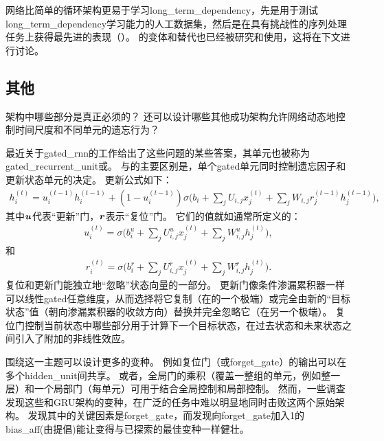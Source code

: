 
网络比简单的循环架构更易于学习\gls{long_term_dependency}，先是用于测试\gls{long_term_dependency}学习能力的人工数据集\citep{Bengio-trnn94,Hochreiter+Schmidhuber-1997,chapter-gradient-flow-2001}，然后是在具有挑战性的序列处理任务上获得最先进的表现（\citep{Graves-book2012,Graves-arxiv2013,Sutskever-et-al-NIPS2014}）。
的变体和替代也已经被研究和使用，这将在下文进行讨论。

\subsection{其他}
\label{sec:other_gated_rnns}
架构中哪些部分是真正必须的？
还可以设计哪些其他成功架构允许网络动态地控制时间尺度和不同单元的遗忘行为？

最近关于\gls{gated_rnn}的工作给出了这些问题的某些答案，其单元也被称为\gls{gated_recurrent_unit}或\citep{cho-al-arxiv14-ssst8,Chung-et-al-NIPSDL2014-small,chung-icml15-gated,Jozefowicz-et-al-ICML2015,Chrupala-et-al-arxiv2015}。
与的主要区别是，单个\gls{gated}单元同时控制遗忘因子和更新状态单元的决定。
更新公式如下：
\begin{align}
 h_i^{(t)} = u_i^{(t-1)} h_i^{(t-1)} + (1 - u_i^{(t-1)}) \sigma 
 \Big( b_i + \sum_j U_{i,j} x_j^{(t)} + \sum_j W_{i,j} r_j^{(t-1)} h_j^{(t-1)} \Big),
\end{align}
其中$\boldsymbol{\mathit{u}}$代表``更新''门，$\boldsymbol{\mathit{r}}$表示``复位''门。
它们的值就如通常所定义的：
\begin{align}
 u_i^{(t)} = \sigma \Big( b_i^u + \sum_j U_{i,j}^u x_j^{(t)} + \sum_j W_{i,j}^u h_j^{(t)} \Big),
\end{align}
和
\begin{align}
 r_i^{(t)} = \sigma \Big( b_i^r + \sum_j U_{i,j}^r x_j^{(t)} + \sum_j W_{i,j}^r h_j^{(t)} \Big).
\end{align}
复位和更新门能独立地``忽略''状态向量的一部分。
更新门像条件渗漏累积器一样可以线性\gls{gated}任意维度，从而选择将它复制（在的一个极端）或完全由新的``目标状态''值（朝向渗漏累积器的收敛方向）替换并完全忽略它（在另一个极端）。
复位门控制当前状态中哪些部分用于计算下一个目标状态，在过去状态和未来状态之间引入了附加的非线性效应。


围绕这一主题可以设计更多的变种。
例如复位门（或\gls{forget_gate}）的输出可以在多个\gls{hidden_unit}间共享。
或者，全局门的乘积（覆盖一整组的单元，例如整一层）和一个局部门（每单元）可用于结合全局控制和局部控制。
然而，一些调查发现这些和GRU架构的变种，在广泛的任务中难以明显地同时击败这两个原始架构\citep{Greff-et-al-arxiv2015,Jozefowicz-et-al-ICML2015}。
\cite{Greff-et-al-arxiv2015}发现其中的关键因素是\gls{forget_gate}，而\cite{Jozefowicz-et-al-ICML2015}发现向\gls{forget_gate}加入1的\gls{bias_aff}(由\cite{Gers-et-al-2000}提倡)能让变得与已探索的最佳变种一样健壮。

